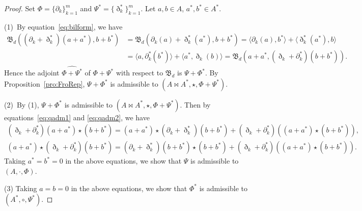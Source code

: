 \documentclass[pdftex]{sigma}
\numberwithin{equation}{section}
\begin{document}
\begin{proof}
	Set $\Phi=\{\partial_k\}_{k=1}^m$ and $\Psi^* = \{\eth_k^*\}_{k=1}^m$.
 Let $a, b \in A$, $a^*, b^* \in A^*$.

 (1)~By equation~\eqref{eq:bilform}, we have
 \begin{align*}
 	\mathfrak{B}_d((\partial_k + \eth_k^*)(a + a^*), b + b^*) &= \mathfrak{B}_d(\partial_k(a) + \eth_k^*(a^*), b + b^*) = \langle \partial_k(a), b^* \rangle + \langle \eth_k^*(a^*), b \rangle \\
 	& = \langle a, \partial_k^*(b^*) \rangle + \langle a^*, \eth_k(b) \rangle
 	= \mathfrak{B}_d(a + a^*, (\eth_k + \partial_k^*)(b + b^*)).
 \end{align*}
 Hence the adjoint $\widehat{\Phi + \Psi^*}$ of $\Phi + \Psi^*$ with respect to $\mathfrak{B}_d$ is $\Psi + \Phi^*$.
 By Proposition~\ref{pro:FroRep},
 $\Psi + \Phi^*$ is admissible to $(A \bowtie A^*, \star, \Phi + \Psi^*)$.

 (2)~By (1), $\Psi + \Phi^*$ is admissible to $(A \bowtie A^*, \star, \Phi + \Psi^*)$.
 Then by equations~\eqref{eq:qadm1} and \eqref{eq:qadm2}, we have
 \begin{gather*}
 (\eth_k + \partial_k^*)(a + a^*) \star (b + b^*) = (a + a^*) \star (\partial_k + \eth_k^*)(b + b^*) + (\eth_k + \partial_k^*)((a + a^*)\star (b + b^*)), \\
 (a + a^*) \star (\eth_k + \partial_k^*)(b + b^*) =(\partial_k + \eth_k^*)(b + b^*) \star (b + b^*) + (\eth_k + \partial_k^*)((a + a^*) \star (b + b^*)).
 \end{gather*}
 Taking $a^* = b^* = 0$ in the above equations,
 we show that $\Psi$ is admissible to $(A, \cdot, \Phi)$.

 (3) Taking $a = b = 0$ in the above equations,
 we show that $\Phi^*$ is admissible to $(A^*, \circ, \Psi^*)$.
\end{proof}
\end{document}
